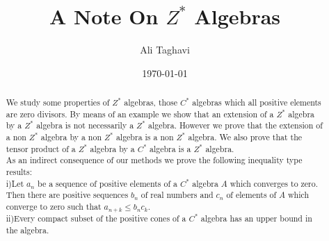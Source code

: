\documentclass[a4paper,10pt]{amsart}
\theoremstyle{definition}
\theoremstyle{plain}
\begin{document}
\title[Note On  $Z^{*}$  Algebras]{A Note  On  $Z^{*}$  Algebras }
\author{Ali Taghavi}

\address{Faculty of Mathematics and Computer Science,  Damghan  University,  Damghan,  Iran.}

\date{\today}


\begin{abstract}
We  study some  properties of $Z^{*}$  algebras, those  $C^{*}$  algebras which  all positive  elements are zero  divisors.  By  means of an example we show  that an  extension of  a $Z^{*}$ algebra by  a  $Z^{*}$  algebra is not    necessarily  a $Z^{*}$  algebra. However we prove that the  extension of a non $Z^{*}$  algebra  by  a  non $Z^{*}$  algebra is  a non $Z^{*}$  algebra. We also prove  that the tensor product of  a $Z^{*}$  algebra by a  $C^{*}$ algebra is a $Z^{*}$  algebra.\\
As an indirect  consequence of   our  methods  we prove the following inequality type results:\\
i)Let $a_{n}$  be  a  sequence of  positive elements of a $C^{*}$ algebra $A$ which converges  to zero. Then there are positive sequences $b_{n}$ of real numbers and $c_{n}$ of  elements of $A$ which converge to zero such that $a_{n+k}\leq b_{n}c_{k}$.\\
ii)Every   compact   subset of  the  positive  cones of  a  $C^{*}$  algebra has  an upper bound in the algebra.
\end{abstract}

\maketitle
\end{document}
